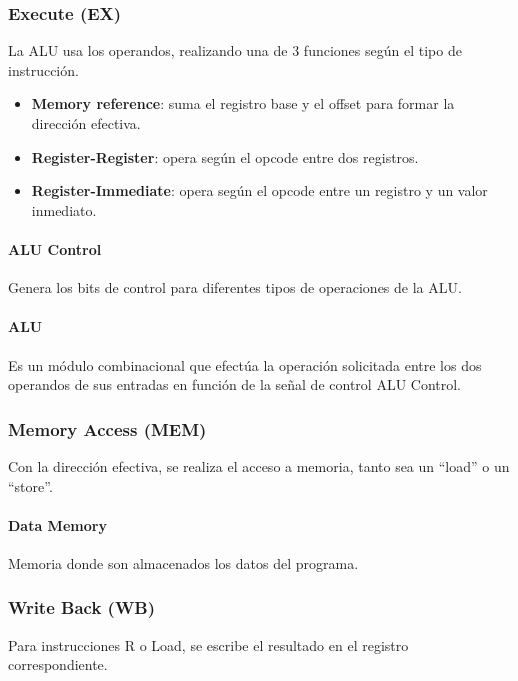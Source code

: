 \documentclass[12pt,A4paper,titlepage]{article}
\begin{document}
\subsubsection{Execute (EX)}
La ALU usa los operandos, realizando una de 3 funciones según el tipo de instrucción.
\begin{itemize}
    \item \textbf{Memory reference}: suma el registro base y el offset para formar la
dirección efectiva.

    \item \textbf{Register-Register}: opera según el opcode entre dos registros.

    \item \textbf{Register-Immediate}: opera según el opcode entre un registro y un valor inmediato.
\end{itemize}

\paragraph{ALU Control}
\hfill \par
Genera los bits de control para diferentes tipos de operaciones de la ALU. 

\paragraph{ALU}
\hfill \par
Es un módulo combinacional que efectúa la operación solicitada entre los dos operandos de sus entradas en función de la señal de control ALU Control.

\subsubsection{Memory Access (MEM)} 
Con la dirección efectiva, se realiza el acceso a memoria, tanto sea un “load” o un “store”.

\paragraph{Data Memory}
\hfill \par 
Memoria donde son almacenados los datos del programa.


\subsubsection{Write Back (WB)}
Para instrucciones R o Load, se escribe el resultado en el registro correspondiente.
\end{document}
